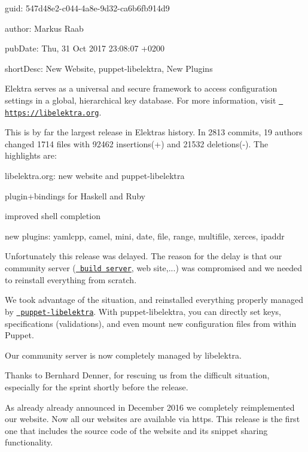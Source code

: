
\begin{DoxyItemize}
\item guid\+: 547d48e2-\/c044-\/4a8e-\/9d32-\/ca6b6fb914d9
\item author\+: Markus Raab
\item pub\+Date\+: Thu, 31 Oct 2017 23\+:08\+:07 +0200
\item short\+Desc\+: New Website, puppet-\/libelektra, New Plugins
\end{DoxyItemize}

Elektra serves as a universal and secure framework to access configuration settings in a global, hierarchical key database. For more information, visit \href{https://libelektra.org}{\texttt{ https\+://libelektra.\+org}}.

This is by far the largest release in Elektra\textquotesingle{}s history. In 2813 commits, 19 authors changed 1714 files with 92462 insertions(+) and 21532 deletions(-\/). The highlights are\+:


\begin{DoxyItemize}
\item libelektra.\+org\+: new website and puppet-\/libelektra
\item plugin+bindings for Haskell and Ruby
\item improved shell completion
\item new plugins\+: yamlcpp, camel, mini, date, file, range, multifile, xerces, ipaddr
\end{DoxyItemize}

Unfortunately this release was delayed. The reason for the delay is that our community server (\href{https://build.libelektra.org}{\texttt{ build server}}, web site,...) was compromised and we needed to reinstall everything from scratch.

We took advantage of the situation, and reinstalled everything properly managed by \href{https://github.com/ElektraInitiative/puppet-libelektra}{\texttt{ puppet-\/libelektra}}. With puppet-\/libelektra, you can directly set keys, specifications (validations), and even mount new configuration files from within Puppet.

Our community server is now completely managed by libelektra.

Thanks to Bernhard Denner, for rescuing us from the difficult situation, especially for the sprint shortly before the release.

As already already announced in December 2016 we completely reimplemented our website. Now all our websites are available via https. This release is the first one that includes the source code of the website and its snippet sharing functionality.

